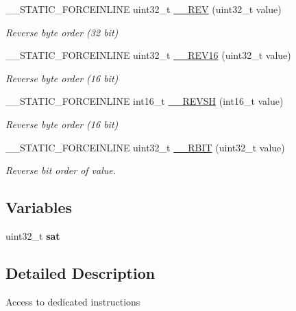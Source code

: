 \begin{DoxyCompactItemize}
\+\_\+\+\_\+\+S\+T\+A\+T\+I\+C\+\_\+\+F\+O\+R\+C\+E\+I\+N\+L\+I\+NE uint32\+\_\+t \mbox{\hyperlink{group___c_m_s_i_s___core___instruction_interface_gadb92679719950635fba8b1b954072695}{\+\_\+\+\_\+\+R\+EV}} (uint32\+\_\+t value)
\begin{DoxyCompactList}\small\item\em Reverse byte order (32 bit) \end{DoxyCompactList}\item 
\+\_\+\+\_\+\+S\+T\+A\+T\+I\+C\+\_\+\+F\+O\+R\+C\+E\+I\+N\+L\+I\+NE uint32\+\_\+t \mbox{\hyperlink{group___c_m_s_i_s___core___instruction_interface_gaa12aedd096506c9639c1581acd5c6a78}{\+\_\+\+\_\+\+R\+E\+V16}} (uint32\+\_\+t value)
\begin{DoxyCompactList}\small\item\em Reverse byte order (16 bit) \end{DoxyCompactList}\item 
\+\_\+\+\_\+\+S\+T\+A\+T\+I\+C\+\_\+\+F\+O\+R\+C\+E\+I\+N\+L\+I\+NE int16\+\_\+t \mbox{\hyperlink{group___c_m_s_i_s___core___instruction_interface_gacb695341318226a5f69ed508166622ac}{\+\_\+\+\_\+\+R\+E\+V\+SH}} (int16\+\_\+t value)
\begin{DoxyCompactList}\small\item\em Reverse byte order (16 bit) \end{DoxyCompactList}\item 
\+\_\+\+\_\+\+S\+T\+A\+T\+I\+C\+\_\+\+F\+O\+R\+C\+E\+I\+N\+L\+I\+NE uint32\+\_\+t \mbox{\hyperlink{group___c_m_s_i_s___core___instruction_interface_gaf944a7b7d8fd70164cca27669316bcf7}{\+\_\+\+\_\+\+R\+B\+IT}} (uint32\+\_\+t value)
\begin{DoxyCompactList}\small\item\em Reverse bit order of value. \end{DoxyCompactList}\end{DoxyCompactItemize}
\subsection*{Variables}
\begin{DoxyCompactItemize}
\item 
uint32\+\_\+t {\bfseries sat}
\end{DoxyCompactItemize}


\subsection{Detailed Description}
Access to dedicated instructions 

